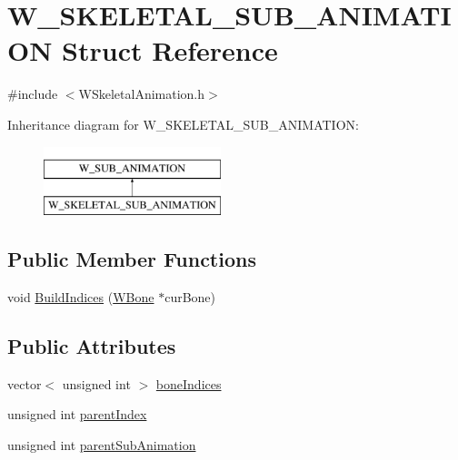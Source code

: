 \hypertarget{struct_w___s_k_e_l_e_t_a_l___s_u_b___a_n_i_m_a_t_i_o_n}{}\section{W\+\_\+\+S\+K\+E\+L\+E\+T\+A\+L\+\_\+\+S\+U\+B\+\_\+\+A\+N\+I\+M\+A\+T\+I\+ON Struct Reference}
\label{struct_w___s_k_e_l_e_t_a_l___s_u_b___a_n_i_m_a_t_i_o_n}


{\ttfamily \#include $<$W\+Skeletal\+Animation.\+h$>$}

Inheritance diagram for W\+\_\+\+S\+K\+E\+L\+E\+T\+A\+L\+\_\+\+S\+U\+B\+\_\+\+A\+N\+I\+M\+A\+T\+I\+ON\+:\begin{figure}[H]
\begin{center}
\leavevmode
\includegraphics[height=2.000000cm]{struct_w___s_k_e_l_e_t_a_l___s_u_b___a_n_i_m_a_t_i_o_n}
\end{center}
\end{figure}
\subsection*{Public Member Functions}
\begin{DoxyCompactItemize}
\item 
void \hyperlink{struct_w___s_k_e_l_e_t_a_l___s_u_b___a_n_i_m_a_t_i_o_n_ab6c08a0ffa3f11201d75b5055fcf1342}{Build\+Indices} (\hyperlink{class_w_bone}{W\+Bone} $\ast$cur\+Bone)
\end{DoxyCompactItemize}
\subsection*{Public Attributes}
\begin{DoxyCompactItemize}
\item 
vector$<$ unsigned int $>$ \hyperlink{struct_w___s_k_e_l_e_t_a_l___s_u_b___a_n_i_m_a_t_i_o_n_ac4f644054904f97c600c12de199a6be0}{bone\+Indices}
\item 
unsigned int \hyperlink{struct_w___s_k_e_l_e_t_a_l___s_u_b___a_n_i_m_a_t_i_o_n_a6b69a69d966354fbcae3671d0d90c416}{parent\+Index}
\item 
unsigned int \hyperlink{struct_w___s_k_e_l_e_t_a_l___s_u_b___a_n_i_m_a_t_i_o_n_ad05d7883de52bdfeed71b63d6f272236}{parent\+Sub\+Animation}
\end{DoxyCompactItemize}


